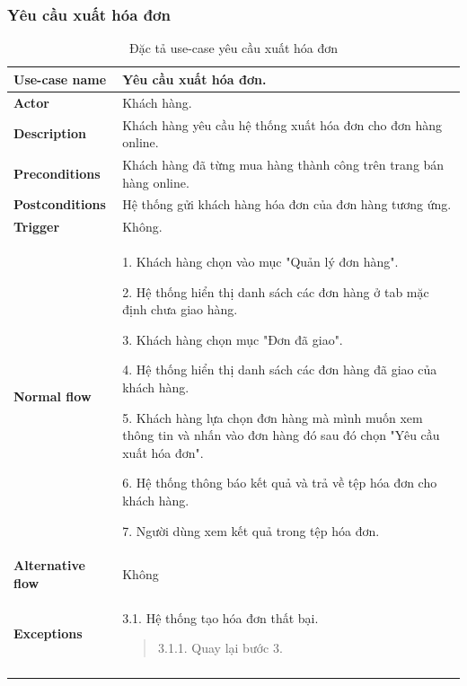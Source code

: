\subsubsection{Yêu cầu xuất hóa đơn}
{
    \setlength\extrarowheight{6pt}
    \begin{longtable}{| p{} | p{} |}
        \hline
        \textbf{Use-case name}
         &
        Yêu cầu xuất hóa đơn.
        \\
        \hline
        \textbf{Actor}
         &
        Khách hàng.
        \\
        \hline
        \textbf{Description}
         &
        Khách hàng yêu cầu hệ thống xuất hóa đơn cho đơn hàng online.
        \\
        \hline
        \textbf{Preconditions}
         &
        Khách hàng đã từng mua hàng thành công trên trang bán hàng online.
        \\
        \hline
        \textbf{Postconditions}
         &
        Hệ thống gửi khách hàng hóa đơn của đơn hàng tương ứng.
        \\
        \hline
        \textbf{Trigger}
         &
        Không.
        \\
        \hline
        \begin{flushleft}
            \textbf{Normal flow}
        \end{flushleft}
         &
        1. Khách hàng chọn vào mục "Quản lý đơn hàng".

        2. Hệ thống hiển thị danh sách các đơn hàng ở tab mặc định chưa giao hàng.

        3. Khách hàng chọn mục "Đơn đã giao".

        4. Hệ thống hiển thị danh sách các đơn hàng đã giao của khách hàng.

        5. Khách hàng lựa chọn đơn hàng mà mình muốn xem thông tin và nhấn vào đơn hàng đó sau đó chọn "Yêu cầu xuất hóa đơn".

        6. Hệ thống thông báo kết quả và trả về tệp hóa đơn cho khách hàng.

        7. Người dùng xem kết quả trong tệp hóa đơn.
        \\
        \hline
        \textbf{Alternative flow}
         &
        Không
        \\
        \hline
        \begin{flushleft}
            \textbf{Exceptions}
        \end{flushleft}
         &
        3.1. Hệ thống tạo hóa đơn thất bại.
        \begin{quote}
            3.1.1. Quay lại bước 3.
        \end{quote}
        \\
        \hline
        \caption{Đặc tả use-case yêu cầu xuất hóa đơn}
    \end{longtable}
}



